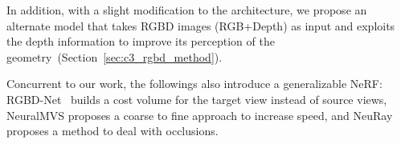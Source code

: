 In addition, with a slight modification to the architecture, we propose an alternate model that takes RGBD images (RGB+Depth) as input and exploits the depth information to improve its perception of the geometry~(Section~\ref{sec:c3_rgbd_method}).

Concurrent to our work, the followings also introduce a generalizable NeRF: RGBD-Net~\cite{nguyen2021rgbd} builds a cost volume for the target view instead of source views, NeuralMVS\cite{rosu2021neuralmvs} proposes a coarse to fine approach to increase speed, and NeuRay~\cite{liu2021neural} proposes a method to deal with occlusions.
